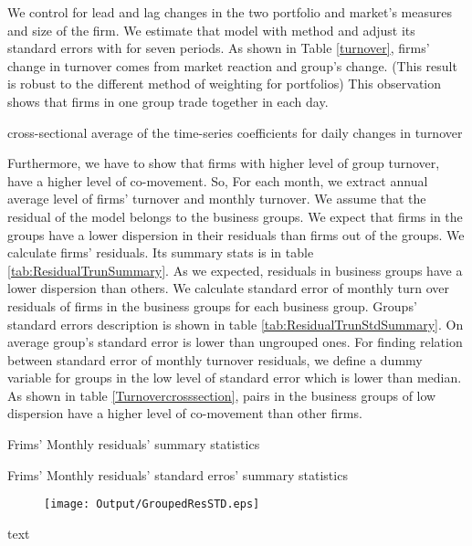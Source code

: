 	
 We control for lead and lag changes in the two portfolio and market's measures and size of the firm. We estimate that model with \cite{FamaMacBeth} method and adjust its standard errors with \cite{newey1987hypothesis} for seven periods.  As shown in Table \ref{turnover}, firms' change in turnover comes from market reaction and group's change. (This result is robust to the different method of weighting for portfolios) This observation shows that firms in one group trade together in each day. 
{\begin{table}[htbp]
	\centering
	\caption{cross-sectional average of the time-series coefficients for daily changes in turnover }
	\resizebox{0.7\textheight}{!}{
		
	} \label{turnover}
\end{table}}

Furthermore, we have to show that firms with higher level of group turnover, have a higher level of co-movement. So, For each month, we extract annual average level of firms' turnover and monthly turnover. We assume that the residual of the model belongs to the business groups. We expect that firms in the groups have a lower dispersion in their residuals than firms out of the groups. We calculate firms' residuals. Its summary stats is in table \ref{tab:ResidualTrunSummary}. As we expected, residuals in business groups have a lower dispersion than others.
We calculate standard error of monthly turn over residuals of firms in the business groups for each business group. Groups' standard errors description is shown in table \ref{tab:ResidualTrunStdSummary}. On average group's standard error is lower than ungrouped  ones. For finding relation between standard error of monthly turnover residuals, we define a dummy variable for groups in the low level of standard error which is lower than median. As shown in table \ref{Turnovercrosssection}, pairs in the business groups of low dispersion have a higher level of co-movement than other firms.  


{			\begin{table}[htbp]
	\centering
	\caption{Frims' Monthly residuals' summary statistics}
	\label{tab:ResidualTrunSummary}
	\resizebox{0.8\textwidth}{!}{
		
	}
\end{table}	
		\begin{table}[htbp]
			\centering
			\caption{Frims' Monthly residuals' standard erros' summary statistics}
			\label{tab:ResidualTrunStdSummary}
			\resizebox{0.8\textwidth}{!}{
				
			}
		\end{table}
\begin{figure}[htbp]
	\centering
	\texttt{[image: Output/GroupedResSTD.eps]}
	\label{fig:GroupedResSTD}
\end{figure}
		\begin{table}[htbp]
			\centering
			\caption{text}
			\label{Turnovercrosssection}
			\resizebox{\textwidth}{!}{
				\centering
				
			}			
		\end{table}}

